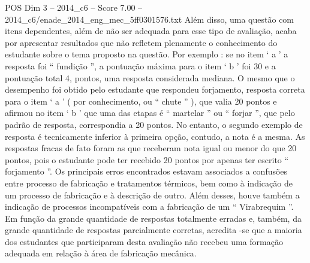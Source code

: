 \begin{textsample}{POS Dim 3 – 2014\_c6 – Score 7.00 – 2014\_c6/enade\_2014\_eng\_mec\_5ff0301576.txt}
Além disso, uma questão com itens dependentes, além de não ser adequada para esse tipo de avaliação, acaba por apresentar resultados que não refletem plenamente o conhecimento do estudante sobre o tema proposto na questão.
Por exemplo : se no item ‘ a ’ a resposta foi “ fundição ”, a pontuação máxima para o item ‘ b ’ foi 30 e a pontuação total 4, pontos, uma resposta considerada mediana.
O mesmo que o desempenho foi obtido pelo estudante que respondeu forjamento, resposta correta para o item ‘ a ’ ( por conhecimento, ou “ chute ” ), que valia 20 pontos e afirmou no item ‘ b ’ que uma das etapas é “ martelar ” ou “ forjar ”, que pelo padrão de resposta, correspondia a 20 pontos.
No entanto, o segundo exemplo de resposta é tecnicamente inferior à primeira opção, contudo, a nota é a mesma.
As respostas fracas de fato foram as que receberam nota igual ou menor do que 20 pontos, pois o estudante pode ter recebido 20 pontos por apenas ter escrito “ forjamento ”.
Os principais erros encontrados estavam associados a confusões entre processo de fabricação e tratamentos térmicos, bem como à indicação de um processo de fabricação e à descrição de outro.
Além desses, houve também a indicação de processos incompatíveis com a fabricação de um “ Virabrequim ”.
Em função da grande quantidade de respostas totalmente erradas e, também, da grande quantidade de respostas parcialmente corretas, acredita -se que a maioria dos estudantes que participaram desta avaliação não recebeu uma formação adequada em relação à área de fabricação mecânica.

\end{textsample}
